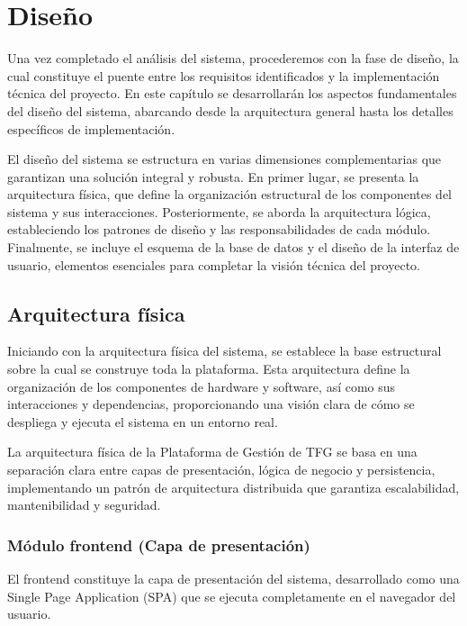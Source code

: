 \documentclass[12pt,a4paper,oneside]{report}
\begin{document}
\chapter{Diseño}\label{diseuxf1o}
Una vez completado el análisis del sistema, procederemos con la fase de
diseño, la cual constituye el puente entre los requisitos identificados
y la implementación técnica del proyecto. En este capítulo se
desarrollarán los aspectos fundamentales del diseño del sistema,
abarcando desde la arquitectura general hasta los detalles específicos
de implementación.

El diseño del sistema se estructura en varias dimensiones
complementarias que garantizan una solución integral y robusta. En
primer lugar, se presenta la arquitectura física, que define la
organización estructural de los componentes del sistema y sus
interacciones. Posteriormente, se aborda la arquitectura lógica,
estableciendo los patrones de diseño y las responsabilidades de cada
módulo. Finalmente, se incluye el esquema de la base de datos y el
diseño de la interfaz de usuario, elementos esenciales para completar la
visión técnica del proyecto.

\section{Arquitectura física}\label{arquitectura-fuxedsica}

Iniciando con la arquitectura física del sistema, se establece la base
estructural sobre la cual se construye toda la plataforma. Esta
arquitectura define la organización de los componentes de hardware y
software, así como sus interacciones y dependencias, proporcionando una
visión clara de cómo se despliega y ejecuta el sistema en un entorno
real.

La arquitectura física de la Plataforma de Gestión de TFG se basa en una
separación clara entre capas de presentación, lógica de negocio y
persistencia, implementando un patrón de arquitectura distribuida que
garantiza escalabilidad, mantenibilidad y seguridad.

\subsection{Módulo frontend (Capa de
presentación)}\label{muxf3dulo-frontend-capa-de-presentaciuxf3n}

El frontend constituye la capa de presentación del sistema, desarrollado
como una Single Page Application (SPA) que se ejecuta completamente en
el navegador del usuario.
\end{document}
